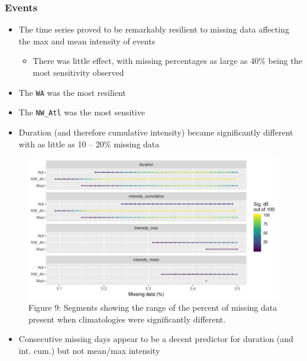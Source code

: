 \documentclass[]{article}
\providecommand{\tightlist}{%
  \setlength{\itemsep}{0pt}\setlength{\parskip}{0pt}}
\begin{document}
\subsubsection{Events}\label{events-1}

\begin{itemize}
\tightlist
\item
  The time series proved to be remarkably resilient to missing data
  affecting the max and mean intensity of events

  \begin{itemize}
  \tightlist
  \item
    There was little effect, with missing percentages as large as 40\%
    being the most sensitivity observed
  \end{itemize}
\item
  The \texttt{WA} was the most resilient
\item
  The \texttt{NW\_Atl} was the most sensitive
\item
  Duration (and therefore cumulative intensity) became significantly
  different with as little as 10 -- 20\% missing data
\end{itemize}

\begin{figure}
\centering
\includegraphics{../docs/articles/missing_data_files/figure-html/event-tukey-line-1.png}
\caption{Figure 9: Segments showing the range of the percent of missing
data present when climatologies were significantly different.}
\end{figure}

\begin{itemize}
\tightlist
\item
  Consecutive missing days appear to be a decent predictor for duration
  (and int. cum.) but not mean/max intensity
\end{itemize}
\end{document}
